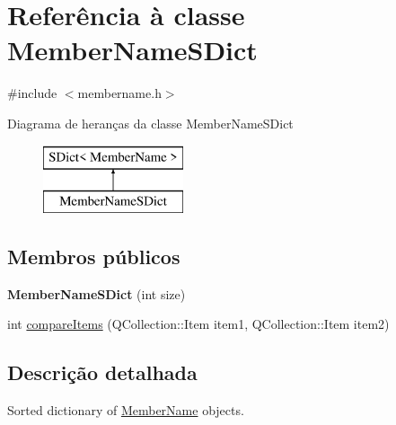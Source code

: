 \hypertarget{class_member_name_s_dict}{\section{Referência à classe Member\-Name\-S\-Dict}
\label{class_member_name_s_dict}
}


{\ttfamily \#include $<$membername.\-h$>$}

Diagrama de heranças da classe Member\-Name\-S\-Dict\begin{figure}[H]
\begin{center}
\leavevmode
\includegraphics[height=2.000000cm]{class_member_name_s_dict}
\end{center}
\end{figure}
\subsection*{Membros públicos}
\begin{DoxyCompactItemize}
\item 
\hypertarget{class_member_name_s_dict_aaa723a0724ff4b24fc5fbe857b0140db}{{\bfseries Member\-Name\-S\-Dict} (int size)}\label{class_member_name_s_dict_aaa723a0724ff4b24fc5fbe857b0140db}

\item 
int \hyperlink{class_member_name_s_dict_a219450accf048597ffc7113ecde4c402}{compare\-Items} (Q\-Collection\-::\-Item item1, Q\-Collection\-::\-Item item2)
\end{DoxyCompactItemize}


\subsection{Descrição detalhada}
Sorted dictionary of \hyperlink{class_member_name}{Member\-Name} objects. 

